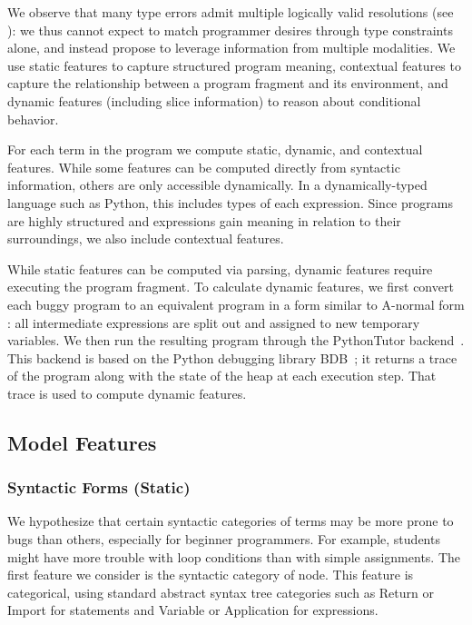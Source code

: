 \documentclass[conference]{IEEEtran}
\begin{document}
We observe that many type errors admit multiple logically valid resolutions
(see ): we thus cannot expect to match programmer desires
through type constraints alone, and instead propose to leverage information
from multiple modalities. We use static features to capture structured
program meaning, contextual features to capture the relationship between a
program fragment and its environment, and dynamic features (including slice
information) to reason about conditional behavior.

For each term in the program we compute static, dynamic, and contextual
features. While some features can be computed directly from syntactic
information, others are only accessible dynamically. In a
dynamically-typed language such as Python, this includes types of each
expression. Since programs are highly structured and expressions gain
meaning in relation to their surroundings, we also include contextual
features.

While static features can be computed via parsing, dynamic features require
executing the program fragment. To calculate dynamic features, we first
convert each buggy program to an equivalent program in a form similar to
A-normal form \cite{anf}: all intermediate expressions are split out and
assigned to new temporary variables.
We then run the resulting program through the PythonTutor
backend~\cite{Guo2013-vu}.  This backend is based on the Python debugging
library BDB~\cite{FIXME}; it returns a trace of the program along with the
state of the heap at each execution step. That trace is used to compute
dynamic features.

\subsection{Model Features}
\label{sec-features}

\subsubsection{Syntactic Forms (Static)}

We hypothesize that certain syntactic categories of terms may be more
prone to bugs than others, especially for beginner programmers.  For
example, students might have more trouble with loop conditions than with
simple assignments. The first feature we consider is the syntactic
category of node. This feature is categorical, using standard abstract
syntax tree categories such as Return or Import for statements and Variable
or Application for expressions.
\end{document}
